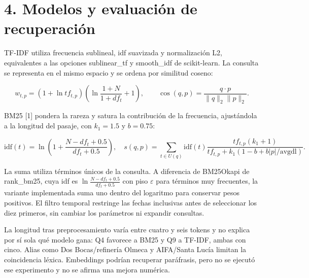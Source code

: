 \documentclass[11pt,a4paper]{article}
\begin{document}
\section*{4. Modelos y evaluación de recuperación}
\par
TF-IDF utiliza frecuencia sublineal, idf suavizada y normalización L2, equivalentes a las opciones sublinear\_\allowbreak{}tf y smooth\_\allowbreak{}idf de scikit-learn. La consulta se representa en el mismo espacio y se ordena por similitud coseno:
\par
\[w_{t,p}=(1+\ln tf_{t,p})\left(\ln\frac{1+N}{1+df_t}+1\right),\qquad \cos(q,p)=\frac{q\cdot p}{\|q\|_2\|p\|_2}.\]
\par
BM25 [1] pondera la rareza y satura la contribución de la frecuencia, ajustándola a la longitud del pasaje, con $k_1=1.5$ y $b=0.75$:
\par
\[\mathrm{idf}(t)=\ln\left(1+\frac{N-df_t+0.5}{df_t+0.5}\right),\quad
s(q,p)=\sum_{t\in U(q)}\mathrm{idf}(t)\frac{tf_{t,p}(k_1+1)}{tf_{t,p}+k_1(1-b+b|p|/\mathrm{avgdl})}.\]
\par
La suma utiliza términos únicos de la consulta. A diferencia de BM25Okapi de rank\_\allowbreak{}bm25, cuya idf es $\ln\frac{N-df_t+0.5}{df_t+0.5}$ con piso $\varepsilon$ para términos muy frecuentes, la variante implementada suma uno dentro del logaritmo para conservar pesos positivos. El filtro temporal restringe las fechas inclusivas antes de seleccionar los diez primeros, sin cambiar los parámetros ni expandir consultas.
\par
La longitud tras preprocesamiento varía entre cuatro y seis tokens y no explica por sí sola qué modelo gana: Q4 favorece a BM25 y Q9 a TF-IDF, ambas con cinco. Alias como Dos Bocas/\allowbreak{}refinería Olmeca y AIFA/\allowbreak{}Santa Lucía limitan la coincidencia léxica. Embeddings podrían recuperar paráfrasis, pero no se ejecutó ese experimento y no se afirma una mejora numérica.
\par
\par
\newpage
\par
\end{document}
